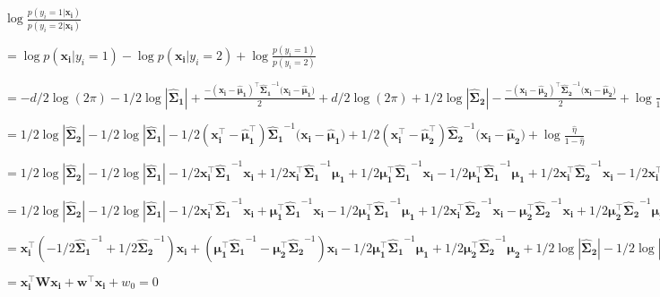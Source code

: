 \documentclass[
]{article}
\begin{document}
\(\log\frac{p(y_i=1|\mathbf{x_i})}{p(y_i=2|\mathbf{x_i})}\)

\(=\log p(\mathbf{x_i}|y_i=1) - \log p(\mathbf{x_i}|y_i=2) + \log \frac{p(y_i=1)}{p(y_i=2)}\)

\(=-d/2\log(2\pi) - 1/2\log|\mathbf{\hat\Sigma_1}| + \frac{-(\mathbf{x_i-\hat\mu_1})^\top \mathbf{\hat\Sigma_1}^{-1} (\mathbf{x_i-\hat\mu_1)}}{2} + d/2\log(2\pi) + 1/2\log|\mathbf{\hat\Sigma_2}| - \frac{-(\mathbf{x_i-\hat\mu_2})^\top \mathbf{\hat\Sigma_2}^{-1} (\mathbf{x_i-\hat\mu_2)}}{2} + \log \frac{\hat\eta}{1-\hat\eta}\)

\(=1/2\log|\mathbf{\hat\Sigma_2}| - 1/2\log|\mathbf{\hat\Sigma_1}| - 1/2(\mathbf{x_i^\top-\hat\mu_1^\top}) \mathbf{\hat\Sigma_1}^{-1} (\mathbf{x_i-\hat\mu_1)} + 1/2(\mathbf{x_i^\top-\hat\mu_2^\top}) \mathbf{\hat\Sigma_2}^{-1} (\mathbf{x_i-\hat\mu_2)} + \log \frac{\hat\eta}{1-\hat\eta}\)

\(=1/2\log|\mathbf{\hat\Sigma_2}| - 1/2\log|\mathbf{\hat\Sigma_1}| - 1/2\mathbf{x_i^\top}\mathbf{\hat\Sigma_1}^{-1}\mathbf{x_i} + 1/2\mathbf{x_i^\top}\mathbf{\hat\Sigma_1}^{-1}\mathbf{\mu_1} + 1/2\mathbf{\mu_1^\top}\mathbf{\hat\Sigma_1}^{-1}\mathbf{x_i} - 1/2\mathbf{\mu_1^\top}\mathbf{\hat\Sigma_1}^{-1}\mathbf{\mu_1} + 1/2\mathbf{x_i^\top}\mathbf{\hat\Sigma_2}^{-1}\mathbf{x_i} - 1/2\mathbf{x_i^\top}\mathbf{\hat\Sigma_2}^{-1}\mathbf{\mu_2} - 1/2\mathbf{\mu_2^\top}\mathbf{\hat\Sigma_2}^{-1}\mathbf{x_i} + 1/2\mathbf{\mu_2^\top}\mathbf{\hat\Sigma_2}^{-1}\mathbf{\mu_2}\)

\(=1/2\log|\mathbf{\hat\Sigma_2}| - 1/2\log|\mathbf{\hat\Sigma_1}| - 1/2\mathbf{x_i^\top}\mathbf{\hat\Sigma_1}^{-1}\mathbf{x_i} + \mathbf{\mu_1^\top}\mathbf{\hat\Sigma_1}^{-1}\mathbf{x_i} - 1/2\mathbf{\mu_1^\top}\mathbf{\hat\Sigma_1}^{-1}\mathbf{\mu_1} + 1/2\mathbf{x_i^\top}\mathbf{\hat\Sigma_2}^{-1}\mathbf{x_i} - \mathbf{\mu_2^\top}\mathbf{\hat\Sigma_2}^{-1}\mathbf{x_i} + 1/2\mathbf{\mu_2^\top}\mathbf{\hat\Sigma_2}^{-1}\mathbf{\mu_2}\)

\(=\mathbf{x_i^\top}(-1/2\mathbf{\hat\Sigma_1}^{-1} + 1/2\mathbf{\hat\Sigma_2}^{-1})\mathbf{x_i} + (\mathbf{\mu_1^\top}\mathbf{\hat\Sigma_1}^{-1} - \mathbf{\mu_2^\top}\mathbf{\hat\Sigma_2}^{-1})\mathbf{x_i} - 1/2\mathbf{\mu_1^\top}\mathbf{\hat\Sigma_1}^{-1}\mathbf{\mu_1} + 1/2\mathbf{\mu_2^\top}\mathbf{\hat\Sigma_2}^{-1}\mathbf{\mu_2} + 1/2\log|\mathbf{\hat\Sigma_2}| - 1/2\log|\mathbf{\hat\Sigma_1}|\)

\(=\mathbf{x_i^\top}\mathbf{W}\mathbf{x_i} + \mathbf{w^\top}\mathbf{x_i} + w_0 = 0\)
\end{document}
